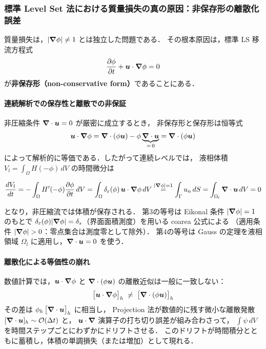 \subsubsection{標準 Level Set 法における質量損失の真の原因：非保存形の離散化誤差}
\label{sec:why_cls_massloss}

質量損失は，$|\bm{\nabla}\phi|\neq 1$ とは独立した問題である．
その根本原因は，標準 LS 移流方程式
\begin{equation}
  \dfrac{\partial \phi}{\partial t} + \bm{u}\cdot\bm{\nabla}\phi = 0
  \label{eq:ls_noncons}
\end{equation}
が\textbf{非保存形（non-conservative form）}であることにある．

\paragraph{連続解析での保存性と離散での非保証}

非圧縮条件 $\bm{\nabla}\cdot\bm{u} = 0$ が厳密に成立するとき，
非保存形と保存形は恒等式
\[
  \bm{u}\cdot\bm{\nabla}\phi
  = \bm{\nabla}\cdot(\phi\bm{u}) - \phi\underbrace{\bm{\nabla}\cdot\bm{u}}_{=\,0}
  = \bm{\nabla}\cdot(\phi\bm{u})
\]
によって解析的に等価である．したがって連続レベルでは，
液相体積 $V_l = \int_\Omega H(-\phi)\,dV$ の時間微分は

\[
  \frac{dV_l}{dt}
  = -\int_\Omega H'(-\phi)\dfrac{\partial \phi}{\partial t}\,dV
  = \int_\Omega \delta_\varepsilon(\phi)\,\bm{u}\cdot\bm{\nabla}\phi\,dV
  \overset{|\bm{\nabla}\phi|=1}{=}
  \int_\Gamma u_n\,dS
  = \int_{\Omega_l} \bm{\nabla}\cdot\bm{u}\,dV = 0
\]

となり，非圧縮流では体積が保存される．
第3の等号は Eikonal 条件 $|\bm{\nabla}\phi|=1$ のもとで $\delta_\varepsilon(\phi)|\bm{\nabla}\phi| = \delta_s$（界面面積測度）を用いる coarea 公式による
（適用条件 $|\bnabla\phi|>0$：零点集合は測度零として除外）．
第4の等号は Gauss の定理を液相領域 $\Omega_l$ に適用し，$\bm{\nabla}\cdot\bm{u}=0$ を使う．

\paragraph{離散化による等価性の崩れ}

数値計算では，$\bm{u}\cdot\bm{\nabla}\phi$ と $\bm{\nabla}\cdot(\phi\bm{u})$ の離散近似は一般に一致しない：
\begin{equation}
  \bigl[\bm{u}\cdot\bm{\nabla}\phi\bigr]_h
  \;\neq\;
  \bigl[\bm{\nabla}\cdot(\phi\bm{u})\bigr]_h
\end{equation}
その差は $\phi_h\,\bigl[\bm{\nabla}\cdot\bm{u}\bigr]_h$ に相当し，
Projection 法が数値的に残す微小な離散発散 $[\bm{\nabla}\cdot\bm{u}]_h \sim \mathcal{O}(\Delta t)$ と，
$\bm{u}\cdot\bm{\nabla}$ 演算子の打ち切り誤差が組み合わさって，
$\int\psi\,dV$ を時間ステップごとにわずかにドリフトさせる．
このドリフトが時間積分とともに蓄積し，体積の単調損失（または増加）として現れる．

